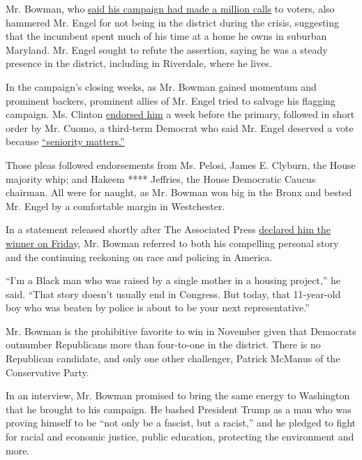 Mr. Bowman, who
\href{https://twitter.com/JamaalBowmanNY/status/1275167126563762177}{said
his campaign had made a million calls} to voters, also hammered Mr.
Engel for not being in the district during the crisis, suggesting that
the incumbent spent much of his time at a home he owns in suburban
Maryland. Mr. Engel sought to refute the assertion, saying he was a
steady presence in the district, including in Riverdale, where he lives.

In the campaign's closing weeks, as Mr. Bowman gained momentum and
prominent backers, prominent allies of Mr. Engel tried to salvage his
flagging campaign. Ms. Clinton
\href{https://www.nytimes.com/2020/06/15/us/politics/hillary-clinton-eliot-engel.html?searchResultPosition=1}{endorsed
him} a week before the primary, followed in short order by Mr. Cuomo, a
third-term Democrat who said Mr. Engel deserved a vote because
\href{https://twitter.com/jessemckinley/status/1273706531868102658}{``seniority
matters.''}

Those pleas followed endorsements from Ms. Pelosi, James E. Clyburn, the
House majority whip; and Hakeem **** Jeffries, the House Democratic
Caucus chairman. All were for naught, as Mr. Bowman won big in the Bronx
and bested Mr. Engel by a comfortable margin in Westchester.

In a statement released shortly after The Associated Press
\href{https://twitter.com/AP_Politics/status/1284144985651249154}{declared
him the winner on Frida}y, Mr. Bowman referred to both his compelling
personal story and the continuing reckoning on race and policing in
America.

``I'm a Black man who was raised by a single mother in a housing
project,'' he said. ``That story doesn't usually end in Congress. But
today, that 11-year-old boy who was beaten by police is about to be your
next representative.''

Mr. Bowman is the prohibitive favorite to win in November given that
Democrats outnumber Republicans more than four-to-one in the district.
There is no Republican candidate, and only one other challenger, Patrick
McManus of the Conservative Party.

In an interview, Mr. Bowman promised to bring the same energy to
Washington that he brought to his campaign. He bashed President Trump as
a man who was proving himself to be ``not only be a fascist, but a
racist,'' and he pledged to fight for racial and economic justice,
public education, protecting the environment and more.

